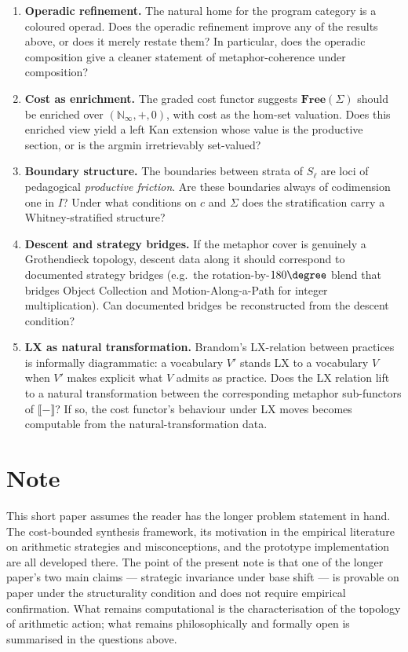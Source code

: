 \documentclass[11pt]{article}
\begin{document}
\begin{enumerate}[noitemsep,topsep=2pt,label=(\arabic*)]
  \item \textbf{Operadic refinement.} The natural home for the program
        category is a coloured operad. Does the operadic refinement
        improve any of the results above, or does it merely restate
        them? In particular, does the operadic composition give a
        cleaner statement of metaphor-coherence under composition?
  \item \textbf{Cost as enrichment.} The graded cost functor suggests
        $\mathbf{Free}(\Sigma)$ should be enriched over
        $(\mathbb{N}_\infty, +, 0)$, with cost as the hom-set
        valuation. Does this enriched view yield a left Kan extension
        whose value is the productive section, or is the argmin
        irretrievably set-valued?
  \item \textbf{Boundary structure.} The boundaries between strata of
        $S_\ell$ are loci of pedagogical \emph{productive friction}.
        Are these boundaries always of codimension one in $I$? Under
        what conditions on $c$ and $\Sigma$ does the stratification
        carry a Whitney-stratified structure?
  \item \textbf{Descent and strategy bridges.} If the metaphor cover
        is genuinely a Grothendieck topology, descent data along it
        should correspond to documented strategy bridges (e.g.\ the
        rotation-by-$180\degree$ blend that bridges Object Collection
        and Motion-Along-a-Path for integer multiplication). Can
        documented bridges be reconstructed from the descent
        condition?
  \item \textbf{LX as natural transformation.} Brandom's
        LX-relation \parencite{brandom2008meaning} between practices
        is informally diagrammatic: a vocabulary $V'$ stands LX to a
        vocabulary $V$ when $V'$ makes explicit what $V$ admits as
        practice. Does the LX relation lift to a natural
        transformation between the corresponding metaphor
        sub-functors of $\llbracket - \rrbracket$? If so, the cost
        functor's behaviour under LX moves becomes computable from
        the natural-transformation data.
\end{enumerate}

\section*{Note}

This short paper assumes the reader has the longer problem statement
in hand. The cost-bounded synthesis framework, its motivation in the
empirical literature on arithmetic strategies and misconceptions, and
the prototype implementation are all developed there. The point of
the present note is that one of the longer paper's two main claims —
strategic invariance under base shift — is provable on paper under
the structurality condition and does not require empirical
confirmation. What remains computational is the characterisation of
the topology of arithmetic action; what remains philosophically and
formally open is summarised in the questions above.

\printbibliography
\end{document}
